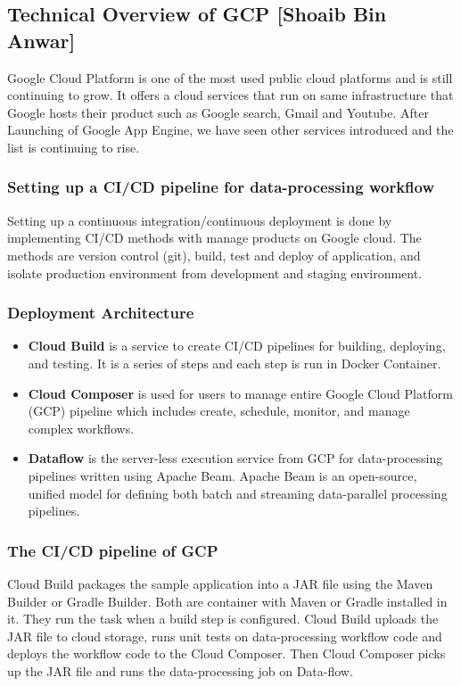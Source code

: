 \subsection{Technical Overview of GCP [Shoaib Bin Anwar]}
%
Google Cloud Platform is one of the most used public cloud platforms and is still continuing to grow. It offers a cloud services that run on same infrastructure that Google hosts their product such as Google search, Gmail and Youtube. After Launching of Google App Engine, we have seen other services introduced and the list is continuing to rise.
%
%


\subsubsection{Setting up a CI/CD pipeline for data-processing workflow}
%
Setting up a continuous integration/continuous deployment is done by implementing CI/CD methods with manage products on Google cloud. The methods are version control (git), build, test and deploy of application, and isolate production environment from  development and staging environment.
%
\subsubsection{Deployment Architecture}
%
\begin{itemize}
    \item  \textbf{Cloud Build} is a service to create CI/CD pipelines for building, deploying, and testing.  It is a series of steps and each step is run in Docker Container. 
    \item \textbf{Cloud Composer} is used for users to manage entire Google Cloud Platform (GCP) pipeline which includes create, schedule, monitor, and manage complex workflows.
    \item \textbf{Dataflow} is the server-less execution service from GCP for data-processing pipelines written using Apache Beam. Apache Beam is an open-source, unified model for defining both batch and streaming data-parallel processing pipelines.
\end{itemize}

\subsubsection{The CI/CD pipeline of GCP}
%
 Cloud Build packages the sample application into a JAR file using the Maven Builder or Gradle Builder. Both are container with Maven or Gradle  installed in it. They run the task when a build step is configured. Cloud Build uploads the JAR file to cloud storage, runs unit tests on data-processing workflow code and deploys the workflow code to the Cloud Composer. Then Cloud Composer picks up the JAR file and runs the data-processing job on Data-flow. 


